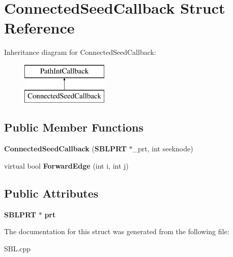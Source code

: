 \section{Connected\+Seed\+Callback Struct Reference}
\label{structConnectedSeedCallback}
Inheritance diagram for Connected\+Seed\+Callback\+:\begin{figure}[H]
\begin{center}
\leavevmode
\includegraphics[height=2.000000cm]{structConnectedSeedCallback}
\end{center}
\end{figure}
\subsection*{Public Member Functions}
\begin{DoxyCompactItemize}
\item 
{\bfseries Connected\+Seed\+Callback} ({\bf S\+B\+L\+P\+RT} $\ast$\+\_\+prt, int seeknode)\label{structConnectedSeedCallback_a70c63570cd652c3678ad76c8f6df2052}

\item 
virtual bool {\bfseries Forward\+Edge} (int i, int j)\label{structConnectedSeedCallback_aacfec4449749226a1899e1a068ac71f0}

\end{DoxyCompactItemize}
\subsection*{Public Attributes}
\begin{DoxyCompactItemize}
\item 
{\bf S\+B\+L\+P\+RT} $\ast$ {\bfseries prt}\label{structConnectedSeedCallback_a23e26a269014c9055036068a289fa4e2}

\end{DoxyCompactItemize}


The documentation for this struct was generated from the following file\+:\begin{DoxyCompactItemize}
\item 
S\+B\+L.\+cpp\end{DoxyCompactItemize}
